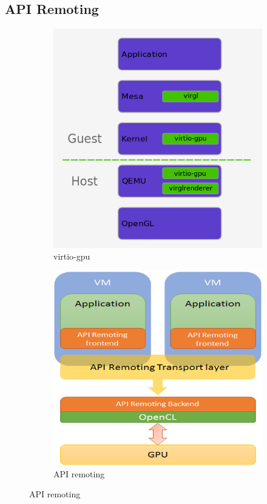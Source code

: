 \documentclass[a4paper,12pt]{article}
\begin{document}
\subsection{API Remoting}
\begin{figure}
  \centering
  \begin{subfigure}[b]{0.4\linewidth}
    \includegraphics[width=\linewidth]{virtio-gpu.png}
     \caption{virtio-gpu}
  \end{subfigure}
  \begin{subfigure}[b]{0.4\linewidth}
    \includegraphics[width=\linewidth]{api_remoting.png}
    \caption{API remoting}
  \end{subfigure}
  \caption{API remoting}
  \label{fig:apiforwarding}
\end{figure}
\end{document}
